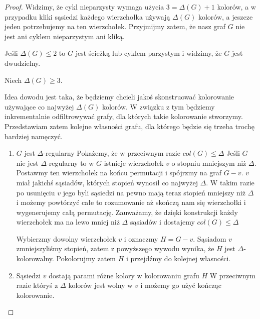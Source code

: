     \begin{proof}
        Widzimy, że cykl nieparzysty wymaga użycia $3 = \Delta(G) + 1$ kolorów,
        a w przypadku kliki sąsiedzi każdego wierzchołka używają $\Delta(G)$ kolorów, a jeszcze jeden potrzebujemy na ten wierzchołek. Przyjmijmy zatem, że nasz graf $G$ nie jest 
        ani cyklem nieparzystym ani kliką. 
        
        Jeśli $\Delta(G) \leq 2$ to $G$ jest ścieżką lub cyklem parzystym i widzimy, że $G$ jest dwudzielny. 
        
        Niech $\Delta(G) \geq 3$. 
        
        Idea dowodu jest taka, że będziemy chcieli jakoś skonstruować kolorowanie używające co najwyżej $\Delta(G)$ kolorów. W związku z tym będziemy inkrementalnie odfiltrowywać grafy, dla których takie kolorowanie stworzymy.
        Przedstawiam zatem kolejne własności grafu, dla którego będzie się trzeba trochę bardziej namęczyć.
        
        \begin{enumerate}
            \item $G$ jest $\Delta$-regularny 
                Pokażemy, że w przeciwnym razie $col(G) \leq \Delta$ 
                Jeśli $G$ nie jest $\Delta$-regularny to w $G$ istnieje wierzchołek $v$ o stopniu mniejszym niż $\Delta$.
                Postawmy ten wierzchołek na końcu permutacji i spójrzmy na graf $G - v$. 
                $v$ miał jakichś sąsiadów, których stopień wynosił co najwyżej $\Delta$.
                W takim razie po usunięciu $v$ jego byli sąsiedzi na pewno mają teraz stopień mniejszy niż $\Delta$ 
                i możemy powtórzyć całe to rozumowanie aż skończą nam się wierzchołki i wygenerujemy całą permutację.
                Zauważamy, że dzięki konstrukcji każdy wierzchołek ma na lewo mniej niż $\Delta$ sąsiadów i dostajemy $col(G) \leq \Delta$ 
            
                Wybierzmy dowolny wierzchołek $v$ i oznaczmy $H = G - v$.
                Sąsiadom $v$ zmniejszyliśmy stopień, zatem z powyższego wywodu wynika, że $H$ jest $\Delta$-kolorowalny.
                Pokolorujmy zatem $H$ i przejdźmy do kolejnej własności.
                
            \item Sąsiedzi $v$ dostają parami różne kolory w kolorowaniu grafu $H$ 
                W przeciwnym razie któryś z $\Delta$ kolorów jest wolny w $v$ i możemy go użyć kończąc kolorowanie. 
                

\end{enumerate}
\end{proof}
